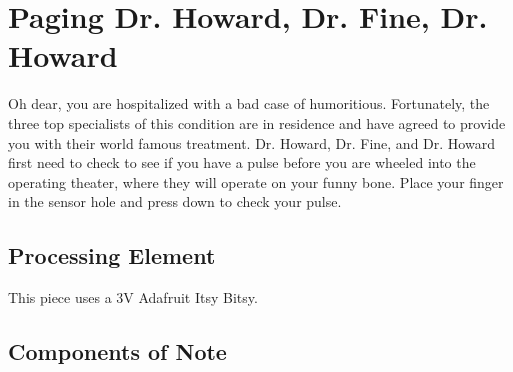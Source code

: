 %
%
%
%
% 
%
%
%
%
%
% 
%

\section{Paging Dr. Howard, Dr. Fine, Dr. Howard}

Oh dear, you are hospitalized with a bad case of humoritious. Fortunately, the
three top specialists of this condition are in residence and have agreed to
provide you with their world famous treatment. Dr. Howard, Dr. Fine, and Dr.
Howard first need to check to see if you have a pulse before you are wheeled
into the operating theater, where they will operate on your funny bone. Place
your finger in the sensor hole and press down to check your pulse.

\subsection*{Processing Element}

This piece uses a 3V Adafruit Itsy Bitsy.

\subsection*{Components of Note}

